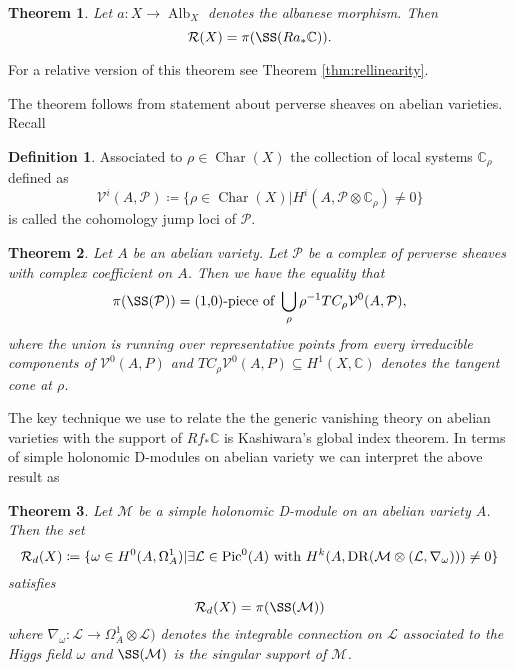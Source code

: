 \documentclass[12pt,reqno]{amsart}
\newtheorem{alphtheorem}{Theorem}
\theoremstyle{question}
\theoremstyle{definition}
\newtheorem{definition}[theorem]{Definition}
\theoremstyle{remark}
\newtheorem{remark}[theorem]{Remark}
\theoremstyle{cited}
\theoremstyle{citeddef}
\DeclareMathOperator{\Alb}{Alb}
\DeclareMathOperator{\Char}{Char}
\def\Pic{{\rm Pic}}
\newcommand{\sL}{\mathcal{L}}
\newcommand{\sM}{\mathcal{M}}
\newcommand{\sP}{\mathcal{P}}
\newcommand{\sR}{\mathcal{R}}
\newcommand\sV{{\mathcal V}}
\newcommand{\bbC}{\mathbb{C}}
\DeclareMathOperator{\dr}{DR}
\begin{document}
\begin{alphtheorem}
Let $a\colon X\to \Alb_X$ denotes the albanese morphism. Then
\[\sR(X) =  \pi(\SS(Ra_*\bbC)). \]
\label{thm:linearity}
\end{alphtheorem}
For a relative version of this theorem see Theorem \ref{thm:rellinearity}.

The theorem follows from statement
about perverse sheaves on abelian varieties. Recall
\begin{definition}
Associated to $\rho\in \Char(X)$ the collection of local systems $\bbC_{\rho}$ defined as
\[\sV^i(A, \sP) \coloneqq \{\rho\in\Char(X)| H^i(A, \sP\otimes \bbC_{\rho}) \neq 0\}\]
is called the cohomology jump loci of $\sP$.
\label{def:cjl}
\end{definition}
\begin{alphtheorem}
Let $A$ be an abelian variety. Let $\sP$ be a complex of perverse sheaves with complex coefficient on $A$. 
Then we have the equality that
$$\pi(\SS(\sP)) = \text{(1,0)-piece of }\bigcup_{\rho} \rho^{-1} TC_{\rho} \sV^0(A,\sP), $$
where the union is running over representative points from every irreducible components of $\sV^0(A,P)$ and
$TC_{\rho} \sV^0(A,P) \subseteq H^1(X, \bbC)$ denotes the tangent cone at $\rho$. 
\label{thm:perverse}
\end{alphtheorem}

The key technique we
use to relate the the generic vanishing theory on abelian varieties with the support of $Rf_*\bbC$ is Kashiwara's
global index theorem. In terms of simple holonomic D-modules
on abelian variety we can interpret the above result as

\begin{alphtheorem}
Let $\sM$ be a simple holonomic D-module on an abelian variety $A$.
Then the set
\[\sR_d(X)\coloneqq \{\omega\in H^0(A, \Omega_A^1)|\exists \sL\in \Pic^0(A) \text{ with }
H^{k}(A, \dr(\sM\otimes(\sL, \nabla_{\omega}))) \neq 0\}\]
satisfies
\[\sR_d(X) = \pi(\SS(\sM))\]
where $\nabla_{\omega}\colon \sL \to \Omega_A^1\otimes \sL)$
denotes the integrable connection on $\sL$ associated to the Higgs
field $\omega$ and $\SS(\sM)$ is the singular support of $\sM$.
\label{thm:dlinearity}
\end{alphtheorem}
\end{document}
